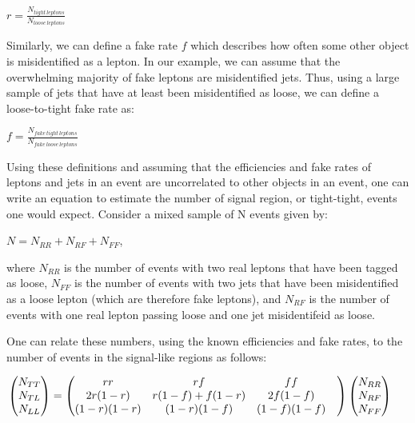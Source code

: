 \begin{center}
$ r = \frac{N_{tight \, leptons} }{N_{loose \, leptons}}$ \\
\end{center}

Similarly, we can define a fake rate $f$ which describes how often some other object is misidentified as a lepton.
In our example, we can assume that the overwhelming majority of fake leptons are misidentified jets.
Thus, using a large sample of jets that have at least been misidentified as loose, we can define a loose-to-tight fake rate as:

\begin{center}
$ f = \frac{N_{fake \, tight \, leptons} }{ N_{fake \, loose \, leptons} } $ \\
\end{center}

Using these definitions and assuming that the efficiencies and fake rates of leptons and jets in an event are uncorrelated to other objects in an event, one can write an equation to estimate the number of signal region, or tight-tight, events one would expect.
Consider a mixed sample of N events given by:

$ N = N_{RR} + N_{RF} + N_{FF} $,

where $N_{RR}$ is the number of events with two real leptons that have been tagged as loose, $N_{FF}$ is the number of events with two jets that have been misidentified as a loose lepton (which are therefore fake leptons), and $N_{RF}$ is the number of events with one real lepton passing loose and one jet misidentifeid as loose.

One can relate these numbers, using the known efficiencies and fake rates, to the number of events in the signal-like regions as follows:


\begin{equation}
  \label{eqn:mm_matrix}
  \hspace{-0.5cm}
  \begin{pmatrix}N_{TT}\\N_{TL}\\N_{LL}\end{pmatrix} 
  = 
  \begin{pmatrix}rr& rf& ff\\ 2r(1-r)& r(1-f) + f(1-r)& 2f(1-f)\\ (1-r)(1-r) & (1-r)(1-f)& (1-f)(1-f)& \\\end{pmatrix}
  \begin{pmatrix}N_{RR}\\N_{RF}\\N_{FF}
  \end{pmatrix}
\end{equation}


